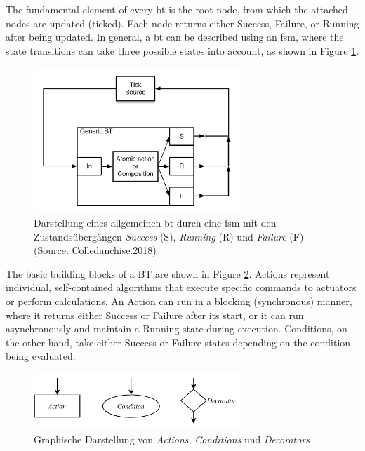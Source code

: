 The fundamental element of every \gls{bt} is the root node, from which the attached nodes are updated (ticked). Each node returns either Success, Failure, or Running after being updated. In general, a \gls{bt} can be described using an \gls{fsm}, where the state transitions can take three possible states into account, as shown in Figure \ref{fig:fsm_general_bt}.

\begin{figure}[h]
    \centering
    \includegraphics[width=0.7\textwidth]{figures/02_state_of_the_art/fsm_general_bt.png}
    \caption[Allgemeiner \textit{Behavior Tree} als FSM]{Darstellung eines allgemeinen \gls{bt} durch eine \gls{fsm} mit den Zustandsübergängen \textit{Success} (S), \textit{Running} (R) und \textit{Failure} (F) (Source: Colledanchise.2018)}
    \label{fig:fsm_general_bt}
                          \end{figure}

The basic building blocks of a BT are shown in Figure \ref{fig:bt_types}. Actions represent individual, self-contained algorithms that execute specific commands to actuators or perform calculations. An Action can run in a blocking (synchronous) manner, where it returns either Success or Failure after its start, or it can run asynchronously and maintain a Running state during execution. Conditions, on the other hand, take either Success or Failure states depending on the condition being evaluated.

\begin{figure}[h]
    \centering
    \includegraphics[width=0.7\textwidth]{figures/02_state_of_the_art/bt_types.pdf}
    \caption{Graphische Darstellung von \textit{Actions}, \textit{Conditions} und \textit{Decorators}}
    \label{fig:bt_types}
\end{figure}


